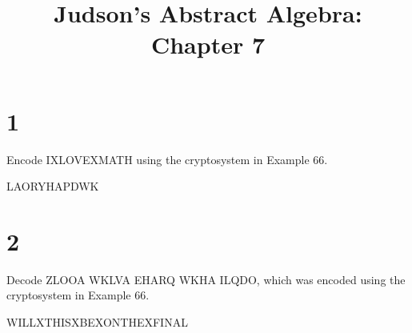 \documentclass[a4paper]{article}
\title{Judson's Abstract Algebra: Chapter 7}
\date{}
\begin{document}
\maketitle


\section*{1}

Encode IXLOVEXMATH using the cryptosystem in Example 66.

\vspace{\baselineskip}

LAORYHAPDWK


\section*{2}

Decode ZLOOA WKLVA EHARQ WKHA ILQDO, which was encoded using the cryptosystem in Example 66.

\vspace{\baselineskip}

WILLXTHISXBEXONTHEXFINAL
\end{document}
